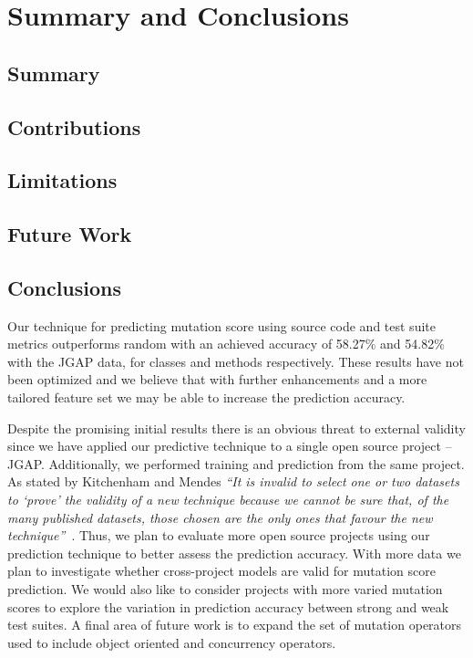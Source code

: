 \chapter{Summary and Conclusions}
\label{chap:conclusions}


\section{Summary}
\label{sec:conclusions_summary}


\section{Contributions}
\label{sec:conclusions_contributions}


\section{Limitations}
\label{sec:conclusions_limitations}


\section{Future Work}
\label{sec:conclusions_future_work}


\section{Conclusions}
\label{sec:conclusions_conclusions}
Our technique for predicting mutation score using source code and test suite metrics outperforms random with an achieved accuracy of 58.27\% and 54.82\% with the JGAP data, for classes and methods respectively. These results have not been optimized and we believe that with further enhancements and a more tailored feature set we may be able to increase the prediction accuracy.

Despite the promising initial results there is an obvious threat to external validity since we have applied our predictive technique to a single open source project -- JGAP. Additionally, we performed training and prediction from the same project. As stated by Kitchenham and Mendes \textit{``It is invalid to select one or two datasets to `prove' the validity of a new technique because we cannot be sure that, of the many published datasets, those chosen are the only ones that favour the new technique''}~\cite{KM09}. Thus, we plan to evaluate more open source projects using our prediction technique to better assess the prediction accuracy. With more data we plan to investigate whether cross-project models are valid for mutation score prediction. We would also like to consider projects with more varied mutation scores to explore the variation in prediction accuracy between strong and weak test suites. A final area of future work is to expand the set of mutation operators used to include object oriented and concurrency operators.
